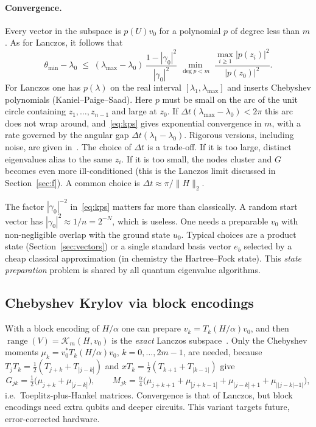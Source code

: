 \documentclass[11pt,a4paper]{article}
\newcommand{\K}{\mathcal{K}}
\begin{document}
\paragraph{Convergence.} Every vector in the subspace is $p(U)v_0$ for a
polynomial $p$ of degree less than $m$. As for Lanczos, it follows that
\begin{equation}\label{eq:kps}
  \theta_{\min}-\lambda_0 \;\le\;
  (\lambda_{\max}-\lambda_0)\,\frac{1-|\gamma_0|^2}{|\gamma_0|^2}\,
  \min_{\deg p<m}\;\frac{\max_{i\ge1}|p(z_i)|^2}{|p(z_0)|^2}.
\end{equation}
For Lanczos one has $p(\lambda)$ on the real interval
$[\lambda_1,\lambda_{\max}]$ and inserts Chebyshev polynomials
(Kaniel--Paige--Saad). Here $p$ must be small on the arc of the unit
circle containing $z_1,\dots,z_{n-1}$ and large at $z_0$. If
$\Delta t(\lambda_{\max}-\lambda_0)<2\pi$ this arc does not wrap around,
and~\eqref{eq:kps} gives exponential convergence in $m$, with a rate
governed by the angular gap $\Delta t(\lambda_1-\lambda_0)$.
Rigorous versions, including noise, are given in~\cite{ELN22,Kirby24}. The choice of
$\Delta t$ is a trade-off. If it is too large, distinct eigenvalues alias
to the same $z_i$. If it is too small, the nodes cluster and $G$
becomes even more ill-conditioned (this is the Lanczos limit discussed
in Section~\ref{sec:f}). A common choice is
$\Delta t\approx \pi/\|H\|_2$.

The factor $|\gamma_0|^{-2}$ in~\eqref{eq:kps} matters far more than
classically. A random start vector has $|\gamma_0|^2\approx 1/n = 2^{-N}$,
which is useless. One needs a preparable $v_0$ with non-negligible
overlap with the ground state $u_0$. Typical choices are a product state
(Section~\ref{sec:vectors}) or a single standard basis vector $e_b$
selected by a cheap classical approximation (in chemistry the
Hartree--Fock state). This \emph{state preparation} problem is shared by all
quantum eigenvalue algorithms.

\subsection{Chebyshev Krylov via block encodings}\label{sec:cheb}

With a block encoding of $H/\alpha$ one can prepare
$v_k = T_k(H/\alpha)v_0$, and then $\operatorname{range}(V)=\K_m(H,v_0)$
is the \emph{exact} Lanczos subspace~\cite{KMM23}. Only the Chebyshev moments
$\mu_k = v_0^*T_k(H/\alpha)v_0$, $k=0,\dots,2m-1$, are needed, because
$T_jT_k = \tfrac12(T_{j+k}+T_{|j-k|})$ and $xT_k=\tfrac12(T_{k+1}+T_{|k-1|})$ give
\begin{equation}
  G_{jk} = \tfrac12\big(\mu_{j+k}+\mu_{|j-k|}\big),\qquad
  M_{jk} = \tfrac{\alpha}{4}\big(\mu_{j+k+1}+\mu_{|j+k-1|}+\mu_{|j-k|+1}+\mu_{||j-k|-1|}\big),
\end{equation}
i.e.\ Toeplitz-plus-Hankel matrices. Convergence is that of Lanczos, but
block encodings need extra qubits and deeper circuits. This variant
targets future, error-corrected hardware.
\end{document}

